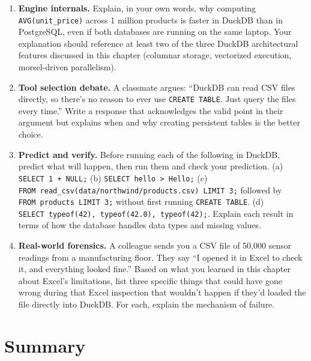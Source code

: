 \documentclass[
  letterpaper,
  DIV=11,
  numbers=noendperiod]{scrreprt}
\begin{document}
\begin{enumerate}
\item
  \textbf{Engine internals.} Explain, in your own words, why computing
  \texttt{AVG(unit\_price)} across 1 million products is faster in
  DuckDB than in PostgreSQL, even if both databases are running on the
  same laptop. Your explanation should reference at least two of the
  three DuckDB architectural features discussed in this chapter
  (columnar storage, vectorized execution, morsel-driven parallelism).
\item
  \textbf{Tool selection debate.} A classmate argues: ``DuckDB can read
  CSV files directly, so there's no reason to ever use
  \texttt{CREATE\ TABLE}. Just query the files every time.'' Write a
  response that acknowledges the valid point in their argument but
  explains when and why creating persistent tables is the better choice.
\item
  \textbf{Predict and verify.} Before running each of the following in
  DuckDB, predict what will happen, then run them and check your
  prediction. (a) \texttt{SELECT\ 1\ +\ NULL;} (b)
  \texttt{SELECT\ \textquotesingle{}hello\textquotesingle{}\ \textgreater{}\ \textquotesingle{}Hello\textquotesingle{};}
  (c)
  \texttt{FROM\ read\_csv(\textquotesingle{}data/northwind/products.csv\textquotesingle{})\ LIMIT\ 3;}
  followed by \texttt{FROM\ products\ LIMIT\ 3;} without first running
  \texttt{CREATE\ TABLE}. (d)
  \texttt{SELECT\ typeof(42),\ typeof(42.0),\ typeof(\textquotesingle{}42\textquotesingle{});}.
  Explain each result in terms of how the database handles data types
  and missing values.
\item
  \textbf{Real-world forensics.} A colleague sends you a CSV file of
  50,000 sensor readings from a manufacturing floor. They say ``I opened
  it in Excel to check it, and everything looked fine.'' Based on what
  you learned in this chapter about Excel's limitations, list three
  specific things that could have gone wrong during that Excel
  inspection that wouldn't happen if they'd loaded the file directly
  into DuckDB. For each, explain the mechanism of failure.
\end{enumerate}

\section{Summary}\label{summary-5}
\end{document}
